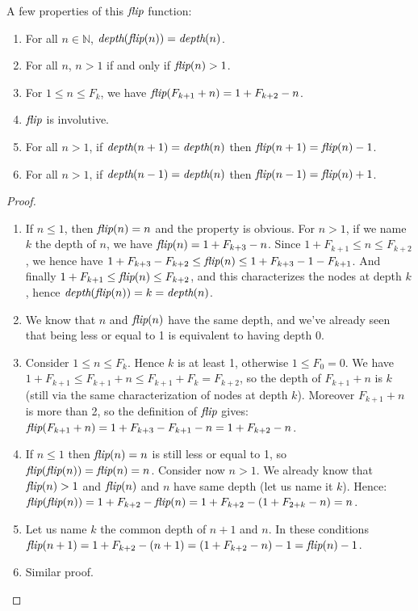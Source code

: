 \documentclass[a4paper,11pt]{article}
\begin{document}
A few properties of this $\textit{flip}$ function:
\begin{theorem}\label{flipprops}
\noindent
\begin{enumerate}
\item For all $n\in\mathbb{N}$, $\textit{depth}(\textit{flip}(n)) = \textit{depth}(n)$.
\item For all $n$, $n>1$ if and only if $\textit{flip}(n)>1$.
\item For $1 \le n \le F_{k}$, we have
 $\textit{flip}(F_{k+1}+n) = 1+F_{k+2}-n$.
\item $\textit{flip}$ is involutive.
\item For all $n>1$, if $\textit{depth}(n+1)=\textit{depth}(n)$ then
  $\textit{flip}(n+1)=\textit{flip}(n)-1$.
\item For all $n>1$, if $\textit{depth}(n-1)=\textit{depth}(n)$ then
  $\textit{flip}(n-1)=\textit{flip}(n)+1$.
\end{enumerate}
\end{theorem}
\begin{proof}
\noindent
\begin{enumerate}
\item If $n\le 1$, then $\textit{flip}(n)=n$ and the property is obvious.
For $n>1$, if we name $k$ the depth of $n$, we have
$\textit{flip}(n) = 1+F_{k+3}-n$. Since $1+F_{k+1} \le n \le F_{k+2}$,
we hence have $1+F_{k+3}-F_{k+2} \le \textit{flip}(n) \le 1+F_{k+3}-1-F_{k+1}$.
And finally $1+F_{k+1} \le \textit{flip}(n) \le F_{k+2}$, and this characterizes
the nodes at depth $k$, hence $\textit{depth}(\textit{flip}(n))=k=\textit{depth}(n)$.
\item We know that $n$ and $\textit{flip}(n)$ have the same depth, and
we've already seen that being less or equal to 1 is equivalent
to having depth 0.
\item Consider $1 \le n \le F_{k}$. Hence $k$ is at least 1,
otherwise $1 \le F_0 = 0$. We have
$1+F_{k+1}\le F_{k+1}+n \le F_{k+1}+F_{k} = F_{k+2}$, so the depth
of $F_{k+1}+n$ is $k$
(still via the same characterization of nodes at depth $k$).
Moreover $F_{k+1}+n$ is more than 2,
so the definition of $\textit{flip}$ gives:
$\textit{flip}(F_{k+1}+n)=1+F_{k+3}-F_{k+1}-n = 1+F_{k+2}-n$.
\item If $n\le 1$ then $\textit{flip}(n)=n$ is still less or equal to 1,
so $\textit{flip}(\textit{flip}(n))=\textit{flip}(n)=n$.
Consider now $n>1$. We already know that $\textit{flip}(n)>1$ and
$\textit{flip}(n)$ and $n$ have same depth (let us name it $k$). Hence:
$\textit{flip}(\textit{flip}(n)) = 1+F_{k+2}-\textit{flip}(n)=1+F_{k+2}-(1+F_{2+k}-n) = n$.
\item Let us name $k$ the common depth of $n+1$ and $n$.
In these conditions
$\textit{flip}(n+1) = 1+F_{k+2}-(n+1) = (1+F_{k+2}-n)-1 = \textit{flip}(n)-1$.
\item Similar proof.
\end{enumerate}
\end{proof}
\end{document}

